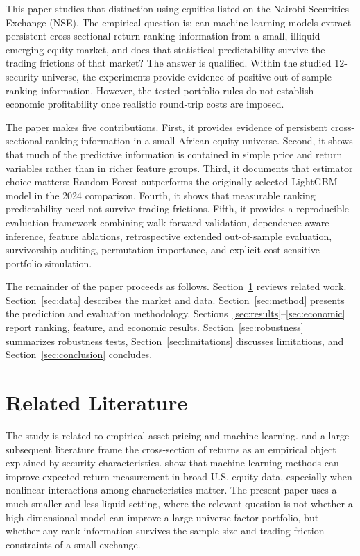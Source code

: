 \documentclass[11pt,a4paper]{article}
\begin{document}
This paper studies that distinction using equities listed on the Nairobi
Securities Exchange (NSE).  The empirical question is: can machine-learning
models extract persistent cross-sectional return-ranking information from a
small, illiquid emerging equity market, and does that statistical
predictability survive the trading frictions of that market?  The answer is
qualified.  Within the studied 12-security universe, the experiments provide
evidence of positive out-of-sample ranking information.  However, the tested
portfolio rules do not establish economic profitability once realistic
round-trip costs are imposed.

The paper makes five contributions.  First, it provides evidence of persistent
cross-sectional ranking information in a small African equity universe.
Second, it shows that much of the predictive information is contained in
simple price and return variables rather than in richer feature groups.  Third,
it documents that estimator choice matters: Random Forest outperforms the
originally selected LightGBM model in the 2024 comparison.  Fourth, it shows
that measurable ranking predictability need not survive trading frictions.
Fifth, it provides a reproducible evaluation framework combining walk-forward
validation, dependence-aware inference, feature ablations, retrospective
extended out-of-sample evaluation, survivorship auditing, permutation
importance, and explicit cost-sensitive portfolio simulation.

The remainder of the paper proceeds as follows.  Section~\ref{sec:literature}
reviews related work.  Section~\ref{sec:data} describes the market and data.
Section~\ref{sec:method} presents the prediction and evaluation methodology.
Sections~\ref{sec:results}--\ref{sec:economic} report ranking, feature, and
economic results.  Section~\ref{sec:robustness} summarizes robustness tests,
Section~\ref{sec:limitations} discusses limitations, and
Section~\ref{sec:conclusion} concludes.

\section{Related Literature}
\label{sec:literature}

The study is related to empirical asset pricing and machine learning.
\citet{fama1992cross} and a large subsequent literature frame the
cross-section of returns as an empirical object explained by security
characteristics.  \citet{gu2020empirical} show that machine-learning methods
can improve expected-return measurement in broad U.S. equity data, especially
when nonlinear interactions among characteristics matter.  The present paper
uses a much smaller and less liquid setting, where the relevant question is
not whether a high-dimensional model can improve a large-universe factor
portfolio, but whether any rank information survives the sample-size and
trading-friction constraints of a small exchange.
\end{document}
